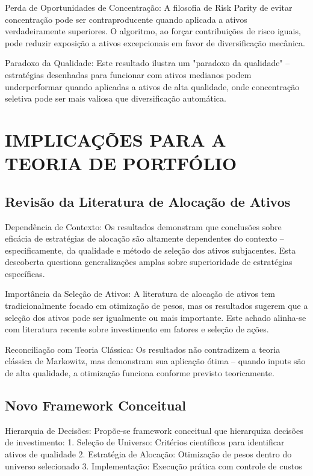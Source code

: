Perda de Oportunidades de Concentração: A filosofia de Risk Parity de evitar concentração pode ser contraproducente quando aplicada a ativos verdadeiramente superiores. O algoritmo, ao forçar contribuições de risco iguais, pode reduzir exposição a ativos excepcionais em favor de diversificação mecânica.

Paradoxo da Qualidade: Este resultado ilustra um "paradoxo da qualidade" – estratégias desenhadas para funcionar com ativos medianos podem underperformar quando aplicadas a ativos de alta qualidade, onde concentração seletiva pode ser mais valiosa que diversificação automática.

\section{IMPLICAÇÕES PARA A TEORIA DE PORTFÓLIO}

\subsection{Revisão da Literatura de Alocação de Ativos}

Dependência de Contexto: Os resultados demonstram que conclusões sobre eficácia de estratégias de alocação são altamente dependentes do contexto – especificamente, da qualidade e método de seleção dos ativos subjacentes. Esta descoberta questiona generalizações amplas sobre superioridade de estratégias específicas.

Importância da Seleção de Ativos: A literatura de alocação de ativos tem tradicionalmente focado em otimização de pesos, mas os resultados sugerem que a seleção dos ativos pode ser igualmente ou mais importante. Este achado alinha-se com literatura recente sobre investimento em fatores e seleção de ações.

Reconciliação com Teoria Clássica: Os resultados não contradizem a teoria clássica de Markowitz, mas demonstram sua aplicação ótima – quando inputs são de alta qualidade, a otimização funciona conforme previsto teoricamente.

\subsection{Novo Framework Conceitual}

Hierarquia de Decisões: Propõe-se framework conceitual que hierarquiza decisões de investimento:
1. Seleção de Universo: Critérios científicos para identificar ativos de qualidade
2. Estratégia de Alocação: Otimização de pesos dentro do universo selecionado
3. Implementação: Execução prática com controle de custos

